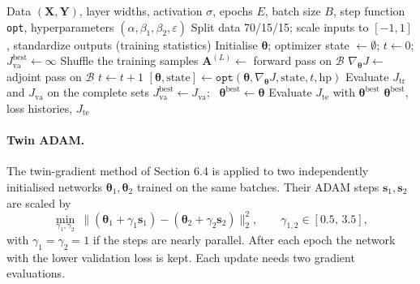 \documentclass[11pt,a4paper]{article}
\begin{document}
\begin{algorithm}[!htbp]
\caption{ANN training with an exchangeable ADAM-type optimizer (\texttt{ADAM\_ANN.m})}
\label{alg:ann}
\begin{algorithmic}[1]
\Require Data $(\bm{X},\bm{Y})$, layer widths, activation $\sigma$, epochs $E$, batch size $B$, step function \texttt{opt}, hyperparameters $(\alpha,\beta_1,\beta_2,\varepsilon)$
\State Split data 70/15/15; scale inputs to $[-1,1]$, standardize outputs (training statistics)
\State Initialise $\bm{\theta}$; optimizer state $\leftarrow\emptyset$; $t\leftarrow0$; $J^{\mathrm{best}}_{\mathrm{va}}\leftarrow\infty$
  \State Shuffle the training samples
    \State $\bm{A}^{(L)} \leftarrow$ forward pass on $\mathcal{B}$ 
    \State $\nabla_{\bm{\theta}} J \leftarrow$ adjoint pass on $\mathcal{B}$ 
    \State $t\leftarrow t+1$
    \State $[\bm{\theta},\text{state}] \leftarrow \texttt{opt}(\bm{\theta},\nabla_{\bm{\theta}}J,\text{state},t,\text{hp})$ 
  \EndFor
  \State Evaluate $J_{\mathrm{tr}}$ and $J_{\mathrm{va}}$ on the complete sets
    \State $J^{\mathrm{best}}_{\mathrm{va}}\leftarrow J_{\mathrm{va}}$; \ $\bm{\theta}^{\mathrm{best}}\leftarrow\bm{\theta}$
  \EndIf
\EndFor
\State Evaluate $J_{\mathrm{te}}$ with $\bm{\theta}^{\mathrm{best}}$
\State \Return $\bm{\theta}^{\mathrm{best}}$, loss histories, $J_{\mathrm{te}}$
\end{algorithmic}
\end{algorithm}

\paragraph{Twin ADAM.}
The twin-gradient method of Section 6.4 \cite{demagistris2026twin} is applied to two independently initialised networks $\bm{\theta}_1,\bm{\theta}_2$ trained on the same batches. Their ADAM steps $\bm{s}_1,\bm{s}_2$ are scaled by
\begin{equation}
  \min_{\gamma_1,\gamma_2}\ \big\| (\bm{\theta}_1 + \gamma_1\bm{s}_1) - (\bm{\theta}_2 + \gamma_2\bm{s}_2) \big\|_2^2 ,
  \qquad \gamma_{1,2}\in[0.5,\,3.5],
\end{equation}
with $\gamma_1=\gamma_2=1$ if the steps are nearly parallel. After each epoch the network with the lower validation loss is kept. Each update needs two gradient evaluations.
\end{document}
